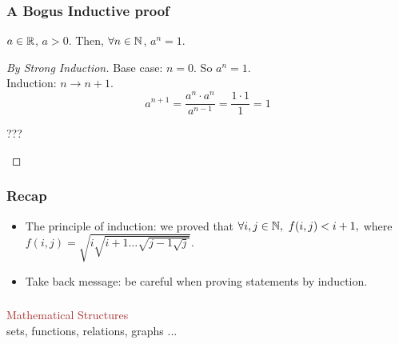  \begin{frame}[fragile]
\frametitle{A Bogus Inductive proof}
\begin{theorem}
$a\in {{\mathbb{R}}}$, $a>0$. Then, $\forall n \in {{\mathbb{N}}}$, $a^n = 1$.
\end{theorem}

\begin{proof}[By Strong Induction]
Base case: $n=0$. So $a^n=1$.\\

Induction: $n\rightarrow n+1$. \\

\[
a^{n+1} = \frac{a^n\cdot a^n}{a^{n-1}} = \frac{1\cdot 1}{1} = 1
\]

\begin{center}
{\Large ???}
\end{center}
\end{proof}

\end{frame}

 \begin{frame}[fragile]
\frametitle{Recap}
\begin{itemize}
\item The principle of induction: we proved that $\forall i,j \in {{\mathbb{N}}}, ~f(i,j) < i+1,$ where $f(i,j) = \sqrt{i\sqrt{i+1 \ldots \sqrt{j-1 \sqrt{j}}}}$. 

\item Take back message: be careful when proving statements by induction.
\end{itemize}
\end{frame}


 \begin{frame}[fragile]
\frametitle{}
\begin{center}
{\Large \textcolor{brown}{Mathematical Structures}}\\
sets, functions, relations, graphs ...
\end{center}
\end{frame}


